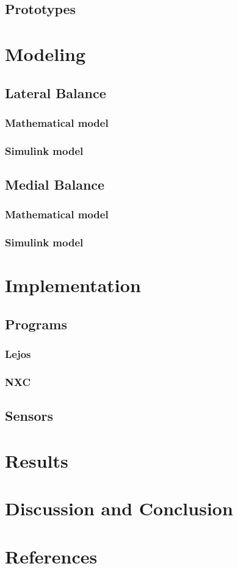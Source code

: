 \documentclass[a4paper]{article}
\begin{document}
	
    
    
    \subsection{Prototypes}

\section{Modeling}
	\subsection{Lateral Balance}
		\subsubsection{Mathematical model}
        \subsubsection{Simulink model}
    \subsection{Medial Balance}
		\subsubsection{Mathematical model}
        \subsubsection{Simulink model}
        
\section{Implementation}
	\subsection{Programs}
    	\subsubsection{Lejos}
    	\subsubsection{NXC}
    \subsection{Sensors}
    
\section{Results}

\section{Discussion and Conclusion}

\section{References}




 

\end{document}
